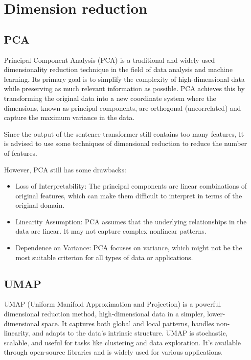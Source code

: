 \section{Dimension reduction}


\subsection{PCA}

Principal Component Analysis (PCA) is a traditional and widely used dimensionality reduction technique in the field of data analysis and machine learning. Its primary goal is to simplify the complexity of high-dimensional data while preserving as much relevant information as possible. PCA achieves this by transforming the original data into a new coordinate system where the dimensions, known as principal components, are orthogonal (uncorrelated) and capture the maximum variance in the data. 

Since the output of the sentence transformer still contains too many features, It is advised to use some techniques of dimensional reduction to reduce the number of features.

However, PCA still has some drawbacks:

\begin{itemize}
    \item Loss of Interpretability: The principal components are linear combinations of original features, which can make them difficult to interpret in terms of the original domain.
    \item Linearity Assumption: PCA assumes that the underlying relationships in the data are linear. It may not capture complex nonlinear patterns.
    \item Dependence on Variance: PCA focuses on variance, which might not be the most suitable criterion for all types of data or applications.
\end{itemize}


\subsection{UMAP}

UMAP (Uniform Manifold Approximation and Projection)\cite{mcinnes2020umap} is a powerful dimensional reduction method, high-dimensional data in a simpler, lower-dimensional space. It captures both global and local patterns, handles non-linearity, and adapts to the data's intrinsic structure. UMAP is stochastic, scalable, and useful for tasks like clustering and data exploration. It's available through open-source libraries and is widely used for various applications.

